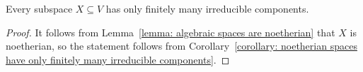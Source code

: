 \begin{corollary}
  Every subspace $X \subseteq V$ has only finitely many irreducible components.
\end{corollary}


\begin{proof}
  It follows from Lemma~\ref{lemma: algebraic spaces are noetherian} that $X$ is noetherian, so the statement follows from Corollary~\ref{corollary: noetherian spaces have only finitely many irreducible components}.
\end{proof}












